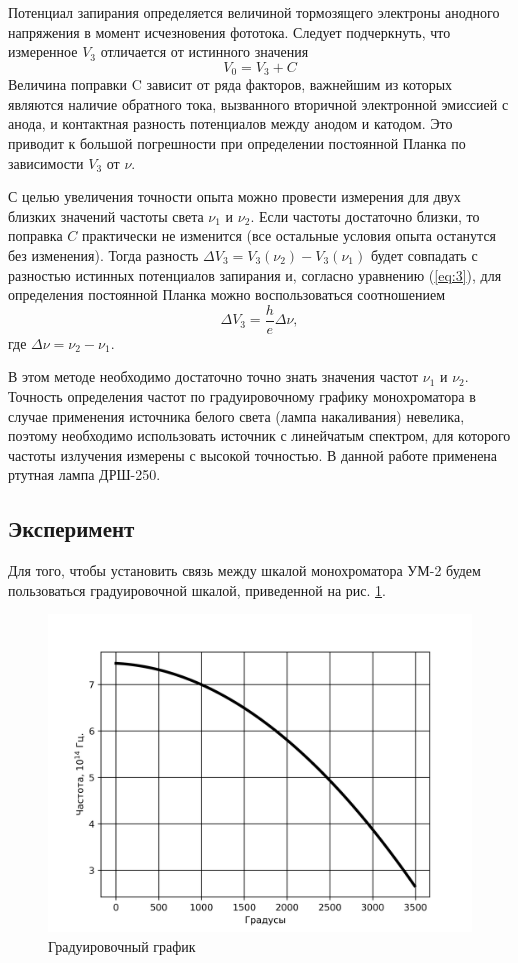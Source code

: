Потенциал запирания определяется величиной тормозящего электроны анодного напряжения в момент исчезновения фототока. Следует подчеркнуть, что измеренное $V_{3}$ отличается от истинного значения
\begin{equation}
	V_0=V_{3}+C
\end{equation}
Величина поправки C зависит от ряда факторов, важнейшим из которых являются наличие обратного тока, вызванного вторичной электронной эмиссией с анода, и контактная разность потенциалов между анодом и катодом. Это приводит к большой погрешности 
при определении постоянной Планка по зависимости $V_{3}$ от $\nu$.

С целью увеличения точности опыта можно провести измерения для двух близких значений частоты света $\nu_1$ и $\nu_2$. Если частоты достаточно близки, то поправка $C$ практически не изменится (все остальные условия опыта останутся без изменения). Тогда разность $\Delta V_{3} = V_{3}(\nu_2)- V_{3}(\nu_1)$ будет совпадать с разностью истинных потенциалов запирания и, согласно уравнению (\ref{eq:3}), для определения постоянной Планка можно воспользоваться соотношением
\begin{equation}
	\Delta V_{3}=\frac he \Delta \nu,
\end{equation}
где $\Delta \nu= \nu_2- \nu_1$.

В этом методе необходимо достаточно точно знать значения частот $\nu_1$ и $\nu_2$. Точность определения частот по градуировочному графику монохроматора в случае применения источника белого света (лампа накаливания) невелика, поэтому необходимо использовать источник с линейчатым спектром, для которого частоты излучения измерены с высокой точностью. В данной работе применена ртутная лампа ДРШ-250. 

\subsection{Эксперимент}
Для того, чтобы установить связь между шкалой монохроматора УМ-2 будем пользоваться градуировочной шкалой, приведенной на рис. \ref{fig:8}. 
\begin{figure}[H]
	\centering
	\includegraphics[width = \linewidth]{graphs/grad}
	\caption{Градуировочный график}
	\label{fig:8}
\end{figure}

